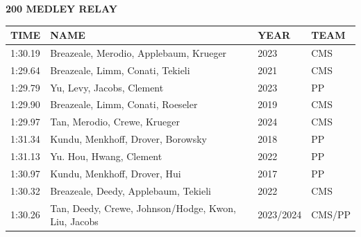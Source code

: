 \begin{table}[H]
\centering
\begin{minipage}[t]{0.6\textwidth}
\centering
\textbf{200 MEDLEY RELAY}\\[0.1cm]
\begin{tabular}{@{}p{1.8cm}p{2.8cm}p{1.2cm}p{1.4cm}@{}}
\hline
    \textbf{TIME} & \textbf{NAME} & \textbf{YEAR} & \textbf{TEAM} \\
\hline
    1:30.19 & Breazeale, Merodio, Applebaum, Krueger & 2023 & CMS \\
    1:29.64 & Breazeale, Limm, Conati, Tekieli & 2021 & CMS \\
    1:29.79 & Yu, Levy, Jacobs, Clement & 2023 & PP \\
    1:29.90 & Breazeale, Limm, Conati, Roeseler & 2019 & CMS \\
    1:29.97 & Tan, Merodio, Crewe, Krueger & 2024 & CMS \\
    1:31.34 & Kundu, Menkhoff, Drover, Borowsky & 2018 & PP \\
    1:31.13 & Yu. Hou, Hwang, Clement & 2022 & PP \\
    1:30.97 & Kundu, Menkhoff, Drover, Hui & 2017 & PP \\
    1:30.32 & Breazeale, Deedy, Applebaum, Tekieli & 2022 & CMS \\
    1:30.26 & Tan, Deedy, Crewe, Johnson/Hodge, Kwon, Liu, Jacobs & 2023/2024 & CMS/PP \\
\hline
\end{tabular}
\end{minipage}
\end{table}

